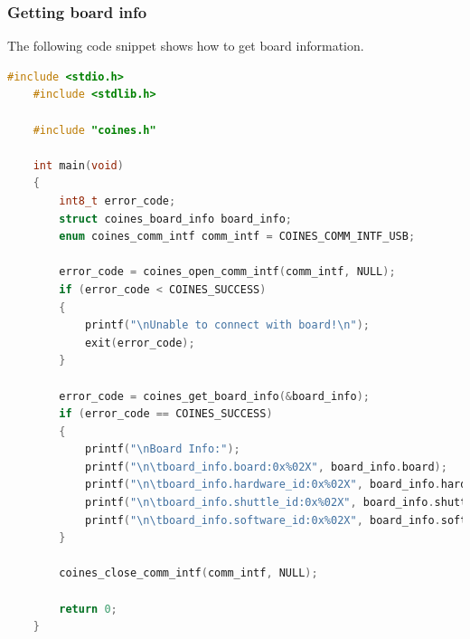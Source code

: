 \documentclass[11pt,headings=small]{scrartcl}
\begin{document}
\subsubsection{Getting board info}
The following code snippet shows how to get board information.
\begin{lstlisting}[language=c]
	#include <stdio.h>
	#include <stdlib.h>
	
	#include "coines.h"
	
	int main(void)
	{
		int8_t error_code;
		struct coines_board_info board_info;
		enum coines_comm_intf comm_intf = COINES_COMM_INTF_USB;
	
		error_code = coines_open_comm_intf(comm_intf, NULL);
		if (error_code < COINES_SUCCESS)
		{
			printf("\nUnable to connect with board!\n");
			exit(error_code);
		}
	
		error_code = coines_get_board_info(&board_info);
		if (error_code == COINES_SUCCESS)
		{
			printf("\nBoard Info:");
			printf("\n\tboard_info.board:0x%02X", board_info.board);
			printf("\n\tboard_info.hardware_id:0x%02X", board_info.hardware_id);
			printf("\n\tboard_info.shuttle_id:0x%02X", board_info.shuttle_id);
			printf("\n\tboard_info.software_id:0x%02X", board_info.software_id);
		}
	
		coines_close_comm_intf(comm_intf, NULL);
	
		return 0;
	}
	
\end{lstlisting}
\end{document}
